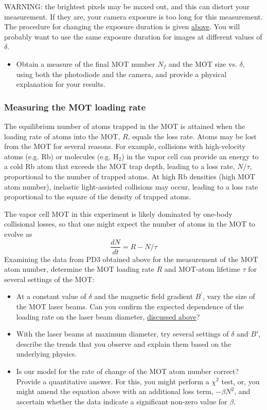 \documentclass{../lab}
\begin{document}
WARNING: the brightest pixels may be maxed out, and this can distort your measurement. If they are, your camera exposure is too long for this measurement. The procedure for changing the exposure duration is given \hyperref[par:InterfaceToTriggeredCCDCamera]{above}. You will probably want to use the same exposure duration for images at different values of $\delta$.

\begin{itemize}
    \item Obtain a measure of the final MOT number $N_f$ and the MOT size vs. $\delta$, using both the photodiode and the camera, and provide a physical explanation for your results.
\end{itemize}

\subsubsection{Measuring the MOT loading rate}

The equilibrium number of atoms trapped in the MOT is attained when the loading rate of atoms into the MOT, $R $, equals the loss rate. Atoms may be lost from the MOT for several reasons. For example, collisions with high-velocity atoms (e.g. Rb) or molecules (e.g. H$_2$) in the vapor cell can provide an energy to a cold Rb atom that exceeds the MOT trap depth, leading to a loss rate, $N / \tau$, proportional to the number of trapped atoms. At high Rb densities (high MOT atom number), inelastic light-assisted collisions may occur, leading to a loss rate proportional to the square of the density of trapped atoms.

The vapor cell MOT in this experiment is likely dominated by one-body collisional losses, so that one might expect the number of atoms in the MOT to evolve as
\begin{equation}
    \frac{d N}{dt} = R -  N / \tau
\end{equation}
Examining the data from PD3 obtained above for the measurement of the MOT atom number, determine the MOT loading rate $ R $ and MOT-atom lifetime $\tau$ for several settings of the MOT:

\begin{itemize}
    \item At a constant value of $\delta$ and the magnetic field gradient $B^\prime $, vary the size of the MOT laser beams. Can you confirm the expected dependence of the loading rate on the laser beam diameter, \hyperref[subsubsec:CaptureVelocity]{discussed above}?

    \item With the laser beams at maximum diameter, try several settings of $\delta$ and $B'$, describe the trends that you observe and explain them based on the underlying physics.

    \item Is our model for the rate of change of the MOT atom number correct? Provide a quantitative answer. For this, you might perform a $\chi^2$ test, or, you might amend the equation above with an additional loss term, $- \beta N^2$, and ascertain whether the data indicate a significant non-zero value for $\beta$.
\end{itemize}
\end{document}
